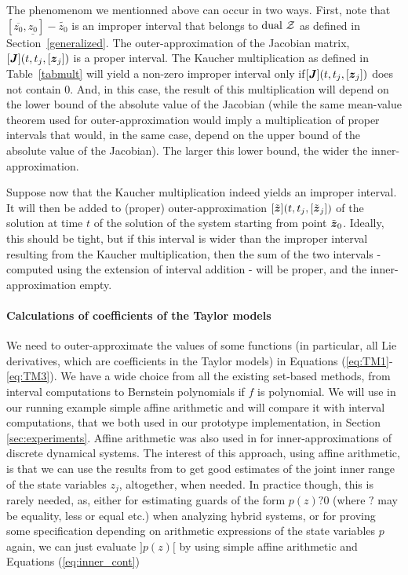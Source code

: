 \documentclass{sig-alternate-05-2015} %
\newcommand{\dual}{\mbox{dual }}
\begin{document}
The phenomenom we mentionned above can occur in two ways. First, note that $[\overline{z_0},\underline{z_0}]-\tilde{z_0}$ is an improper interval that belongs to $\dual {\cal Z}$ as defined 
in Section~\ref{generalized}. The outer-approximation of the Jacobian matrix,  $[\J](t,t_j,[{\z}_j])$ is a proper interval. The Kaucher multiplication as defined in Table~\ref{tabmult}
will yield a non-zero improper interval only if$[\J](t,t_j,[{\z}_j])$ does not contain $0$. And, in this case, the result of this multiplication will depend on the 
lower bound of the absolute value of the Jacobian (while the same mean-value theorem used for outer-approximation would imply a multiplication of proper intervals that would, 
in the same case, depend on the upper bound of the absolute value of the Jacobian). The larger this lower bound, the wider the inner-approximation. 

Suppose now that the Kaucher multiplication indeed yields an improper interval. It will then be added to (proper) outer-approximation  $[\tilde{\z}](t,t_j,[\tilde{\z}_j])$ 
of the solution at time $t$ of the solution of the system starting from point $\tilde{\z}_0$. Ideally, this should be tight, but if this interval is wider than the improper 
interval resulting from the Kaucher multiplication, then the sum of the two intervals - computed using the extension of interval addition - will be proper, 
and the inner-approximation empty. 

\paragraph{Calculations of coefficients of the Taylor models}

We need to outer-approximate the values of some functions (in particular, all Lie
derivatives, which are coefficients in the Taylor models) in Equations 
(\ref{eq:TM1}-\ref{eq:TM3}). We have a wide choice from all the existing set-based
methods, from interval computations to Bernstein polynomials \cite{Dang} if $f$
is polynomial. We will use in our running example simple affine arithmetic
\cite{com-sto-93-aa} and will compare it with interval computations, that we
both used in our prototype implementation, in Section \ref{sec:experiments}. 
Affine arithmetic was also used in \cite{hscc14} for inner-approximations of
discrete dynamical systems. The interest of this approach, using affine arithmetic,
is that we can use the results from \cite{rc13} to get good estimates of the
joint inner range of the state variables $z_j$, altogether, when needed. In practice
though, this is rarely needed, as, either for estimating guards of the form
$p(z) ? 0$ (where $?$ may be equality, less or equal etc.) when analyzing
hybrid systems, or for proving some specification depending on arithmetic expressions of
the state variables $p$ again, we can just evaluate $]p(z)[$ by using simple
affine arithmetic and 
Equations (\ref{eq:inner_cont})
\end{document}
